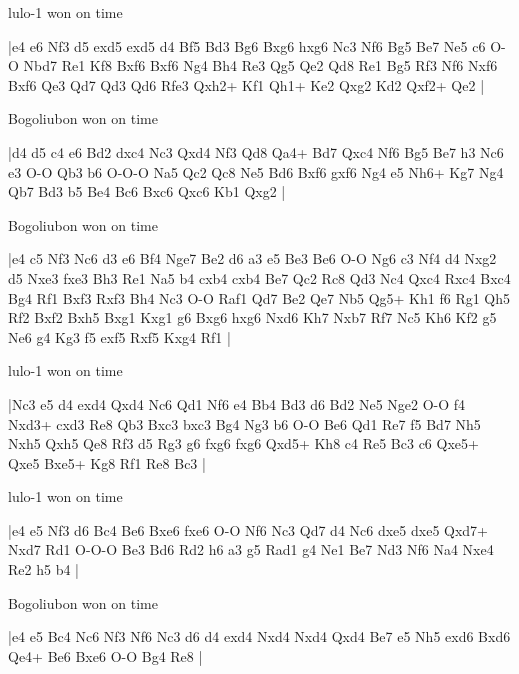 lulo-1 won on time

\makegametitle
|e4 e6 Nf3 d5 exd5 exd5 d4 Bf5 Bd3 Bg6 Bxg6 hxg6 Nc3 Nf6 Bg5 Be7 Ne5 c6 O-O Nbd7 Re1 Kf8 Bxf6 Bxf6 Ng4 Bh4 Re3 Qg5 Qe2 Qd8 Re1 Bg5 Rf3 Nf6 Nxf6 Bxf6 Qe3 Qd7 Qd3 Qd6 Rfe3 Qxh2+ Kf1 Qh1+ Ke2 Qxg2 Kd2 Qxf2+ Qe2  |

\showboard

Bogoliubon won on time

\makegametitle
|d4 d5 c4 e6 Bd2 dxc4 Nc3 Qxd4 Nf3 Qd8 Qa4+ Bd7 Qxc4 Nf6 Bg5 Be7 h3 Nc6 e3 O-O Qb3 b6 O-O-O Na5 Qc2 Qc8 Ne5 Bd6 Bxf6 gxf6 Ng4 e5 Nh6+ Kg7 Ng4 Qb7 Bd3 b5 Be4 Bc6 Bxc6 Qxc6 Kb1 Qxg2  |

\showboard

Bogoliubon won on time

\makegametitle
|e4 c5 Nf3 Nc6 d3 e6 Bf4 Nge7 Be2 d6 a3 e5 Be3 Be6 O-O Ng6 c3 Nf4 d4 Nxg2 d5 Nxe3 fxe3 Bh3 Re1 Na5 b4 cxb4 cxb4 Be7 Qc2 Rc8 Qd3 Nc4 Qxc4 Rxc4 Bxc4 Bg4 Rf1 Bxf3 Rxf3 Bh4 Nc3 O-O Raf1 Qd7 Be2 Qe7 Nb5 Qg5+ Kh1 f6 Rg1 Qh5 Rf2 Bxf2 Bxh5 Bxg1 Kxg1 g6 Bxg6 hxg6 Nxd6 Kh7 Nxb7 Rf7 Nc5 Kh6 Kf2 g5 Ne6 g4 Kg3 f5 exf5 Rxf5 Kxg4 Rf1  |

\showboard

lulo-1 won on time

\makegametitle
|Nc3 e5 d4 exd4 Qxd4 Nc6 Qd1 Nf6 e4 Bb4 Bd3 d6 Bd2 Ne5 Nge2 O-O f4 Nxd3+ cxd3 Re8 Qb3 Bxc3 bxc3 Bg4 Ng3 b6 O-O Be6 Qd1 Re7 f5 Bd7 Nh5 Nxh5 Qxh5 Qe8 Rf3 d5 Rg3 g6 fxg6 fxg6 Qxd5+ Kh8 c4 Re5 Bc3 c6 Qxe5+ Qxe5 Bxe5+ Kg8 Rf1 Re8 Bc3  |

\showboard

lulo-1 won on time

\makegametitle
|e4 e5 Nf3 d6 Bc4 Be6 Bxe6 fxe6 O-O Nf6 Nc3 Qd7 d4 Nc6 dxe5 dxe5 Qxd7+ Nxd7 Rd1 O-O-O Be3 Bd6 Rd2 h6 a3 g5 Rad1 g4 Ne1 Be7 Nd3 Nf6 Na4 Nxe4 Re2 h5 b4  |

\showboard

Bogoliubon won on time

\makegametitle
|e4 e5 Bc4 Nc6 Nf3 Nf6 Nc3 d6 d4 exd4 Nxd4 Nxd4 Qxd4 Be7 e5 Nh5 exd6 Bxd6 Qe4+ Be6 Bxe6 O-O Bg4 Re8  |

